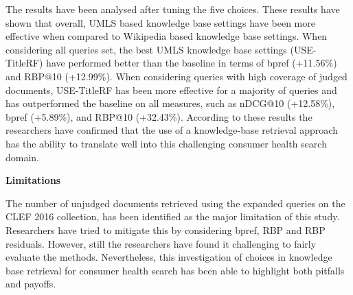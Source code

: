 \documentclass[]{article}
\begin{document}
The results have been analysed after tuning the five choices. These results have shown that overall, UMLS based knowledge base settings have been more effective when compared to Wikipedia based knowledge base settings.  When considering all queries set, the best UMLS knowledge base settings (USE-TitleRF) have performed better than the baseline in terms of bpref (+11.56\%) and RBP@10 (+12.99\%). When considering queries with high coverage of judged documents, USE-TitleRF has been more effective for a majority of queries and has outperformed the baseline on all measures, such as nDCG@10 (+12.58\%), bpref (+5.89\%), and RBP@10 (+32.43\%). According to these results the researchers have confirmed that the use of a knowledge-base retrieval approach has the ability to translate well into this challenging consumer health search domain.                   

\textbf{Limitations}

The number of unjudged documents retrieved using the expanded queries on the CLEF 2016 collection, has been identified as the major limitation of this study. Researchers have tried to mitigate this by considering bpref, RBP and RBP residuals. However, still the researchers have found it challenging to fairly evaluate the methods. Nevertheless, this investigation of choices in knowledge base retrieval for consumer health search has been able to highlight both pitfalls and payoffs.
 
\end{document}
